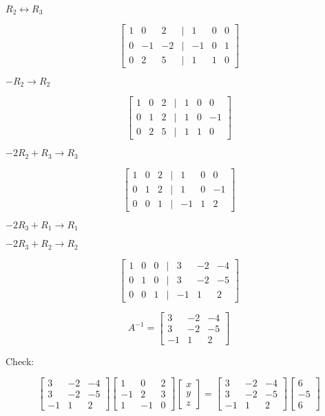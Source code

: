 \documentclass[a4paper,11pt,twoside]{report}
\begin{document}
$R_2 \leftrightarrow R_3$

\[\begin{bmatrix}  1 & 0 & 2 & | & 1 & 0 & 0  \\ 0 & -1 & -2 & | & -1 & 0 & 1 \\ 0 & 2 & 5 & | & 1 & 1 & 0 \end{bmatrix} \]

$-R_2 \to R_2$

\[\begin{bmatrix}  1 & 0 & 2 & | & 1 & 0 & 0  \\ 0 & 1 & 2 & | & 1 & 0 & -1 \\ 0 & 2 & 5 & | & 1 & 1 & 0 \end{bmatrix} \]

$-2R_2 + R_3 \to R_3$

\[\begin{bmatrix}  1 & 0 & 2 & | & 1 & 0 & 0  \\ 0 & 1 & 2 & | & 1 & 0 & -1 \\ 0 & 0 & 1 & | & -1 & 1 & 2 \end{bmatrix} \]

$-2R_3 + R_1 \to R_1$

$-2R_3 + R_2 \to R_2$

\[\begin{bmatrix}  1 & 0 & 0 & | & 3 & -2 & -4  \\ 0 & 1 & 0 & | & 3 & -2 & -5 \\ 0 & 0 & 1 & | & -1 & 1 & 2 \end{bmatrix} \]

\[A^{-1} = \boxed{\begin{bmatrix}   3 & -2 & -4  \\  3 & -2 & -5 \\  -1 & 1 & 2 \end{bmatrix}} \]

Check:

\[ \begin{bmatrix}   3 & -2 & -4  \\  3 & -2 & -5 \\  -1 & 1 & 2 \end{bmatrix}
\begin{bmatrix} 1 & 0 & 2 \\ -1 & 2 & 3 \\ 1 & -1 & 0 \end{bmatrix}
\begin{bmatrix} x \\ y \\ z \end{bmatrix} =
 \begin{bmatrix}   3 & -2 & -4  \\  3 & -2 & -5 \\  -1 & 1 & 2 \end{bmatrix}
\begin{bmatrix} 6 \\ -5 \\ 6 \end{bmatrix} \]
\end{document}
